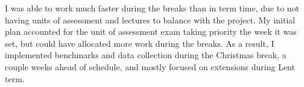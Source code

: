 I was able to work much faster during the breaks than in term time, due to not having units of assessment and lectures to balance with the project. My initial plan accounted for the unit of assessment exam taking priority the week it was set, but could have allocated more work during the breaks. As a result, I implemented benchmarks and data collection during the Christmas break, a couple weeks ahead of schedule, and mostly focused on extensions during Lent term.







%



